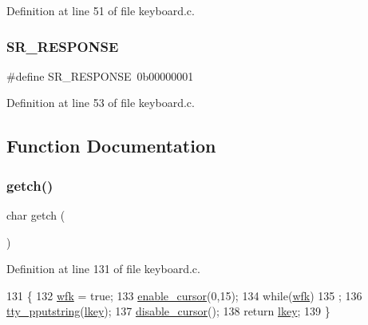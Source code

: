 Definition at line 51 of file keyboard.\+c.

\mbox{\label{a00032_ac9efa716f8185bae296975136b510c30_ac9efa716f8185bae296975136b510c30}} 
\subsubsection{\texorpdfstring{S\+R\+\_\+\+R\+E\+S\+P\+O\+N\+SE}{SR\_RESPONSE}}
{\footnotesize\ttfamily \#define S\+R\+\_\+\+R\+E\+S\+P\+O\+N\+SE~0b00000001}



Definition at line 53 of file keyboard.\+c.



\subsection{Function Documentation}
\mbox{\label{a00032_af3facad10e05defa48d45b46eb9ebe7e_af3facad10e05defa48d45b46eb9ebe7e}} 
\subsubsection{\texorpdfstring{getch()}{getch()}}
{\footnotesize\ttfamily char getch (\begin{DoxyParamCaption}{ }\end{DoxyParamCaption})}



Definition at line 131 of file keyboard.\+c.


\begin{DoxyCode}
131              \{
132     \hyperlink{a00032_a6ddd5223379778858edc46ffbec19775_a6ddd5223379778858edc46ffbec19775}{wfk} = \textcolor{keyword}{true};
133     \hyperlink{a00173_afe197dc4dbfa6036ef04abd2aeeeca2d_afe197dc4dbfa6036ef04abd2aeeeca2d}{enable\_cursor}(0,15);
134     \textcolor{keywordflow}{while}(\hyperlink{a00032_a6ddd5223379778858edc46ffbec19775_a6ddd5223379778858edc46ffbec19775}{wfk})
135         ;
136     \hyperlink{a00173_ade960b1320324706aac6c00cc6b1b2fe_ade960b1320324706aac6c00cc6b1b2fe}{tty\_pputstring}(\hyperlink{a00032_ade374650022cb30c4f5591a8dafad685_ade374650022cb30c4f5591a8dafad685}{lkey});
137     \hyperlink{a00173_a3d09038c7b6436e60b228f2f3f451f6a_a3d09038c7b6436e60b228f2f3f451f6a}{disable\_cursor}();
138     \textcolor{keywordflow}{return} \hyperlink{a00032_ade374650022cb30c4f5591a8dafad685_ade374650022cb30c4f5591a8dafad685}{lkey};
139 \}
\end{DoxyCode}
\mbox{\label{a00032_aa7ee03b27a489828ce588d0fc023cab3_aa7ee03b27a489828ce588d0fc023cab3}} 
